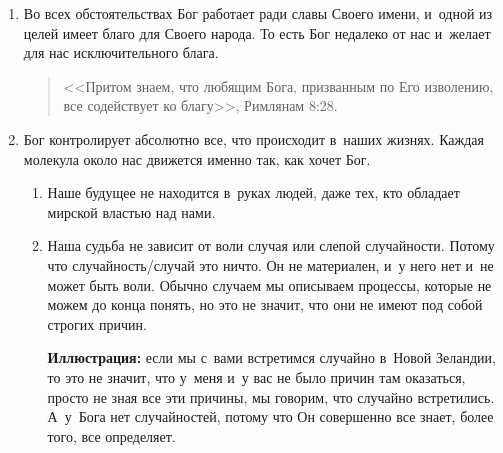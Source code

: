 \documentclass[a4paper,12pt]{article}
\begin{document}
\begin{enumerate}
\begin{itemize}
\begin{enumerate}
        \item Во всех обстоятельствах Бог работает ради славы Своего имени, и~одной из целей имеет благо для Своего народа. То есть Бог недалеко от нас и~желает для нас исключительного блага.
        \begin{quote}
        <<Притом знаем, что любящим Бога, призванным по Его изволению, все содействует ко благу>>, Римлянам 8:28.
        \end{quote}  
        \item Бог контролирует абсолютно все, что происходит в~наших жизнях. Каждая молекула около нас движется именно так, как хочет Бог.
        \begin{enumerate}
            \item Наше будущее не находится в~руках людей, даже тех, кто обладает мирской властью над нами.
            \item Наша судьба не зависит от воли случая или слепой случайности. Потому что случайность/случай это ничто. Он не материален, и~у него нет и~не может быть воли. Обычно случаем мы описываем процессы, которые не можем до конца понять, но это не значит, что они не имеют под собой строгих причин. 
            
            \textbf{Иллюстрация:} если мы с~вами встретимся случайно в~Новой Зеландии, то это не значит, что у~меня и~у вас не было причин там оказаться, просто не зная все эти причины, мы говорим, что случайно встретились. А~у~Бога нет случайностей, потому что Он совершенно все знает, более того, все определяет.
        \end{enumerate}


\end{enumerate}
\end{itemize}
\end{enumerate}
\end{document}
